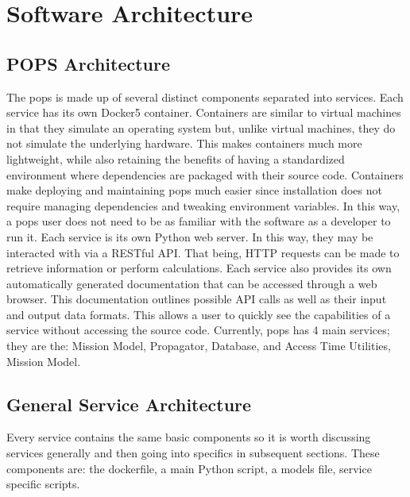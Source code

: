 \glsresetall{} 
\chapter{Software Architecture}


\section{POPS Architecture}

The \gls{pops} is made up of several distinct components separated into
services.  Each service has its own Docker5 container. Containers are similar
to virtual machines in that they simulate an operating system but, unlike
virtual machines, they do not simulate the underlying hardware. This makes
containers much more lightweight, while also retaining the benefits of having a
standardized environment where dependencies are packaged with their source
code. Containers make deploying and maintaining \gls{pops} much easier since
installation does not require managing dependencies and tweaking environment
variables. In this way, a \gls{pops} user does not need to be as familiar with
the software as a developer to run it. Each service is its own Python web
server. In this way, they may be interacted with via a RESTful API. That being,
HTTP requests can be made to retrieve information or perform calculations. Each
service also provides its own automatically generated documentation that can be
accessed through a web browser. This documentation outlines possible API calls
as well as their input and output data formats.  This allows a user to quickly
see the capabilities of a service without accessing the source code. Currently,
\gls{pops} has 4 main services; they are the: Mission Model, Propagator,
Database, and Access Time Utilities,  Mission Model.

\section{General Service Architecture}

Every service contains the same basic components so it is worth discussing
services generally and then going into specifics in subsequent sections. These
components are: the dockerfile, a main Python script, a models file, service
specific scripts.


